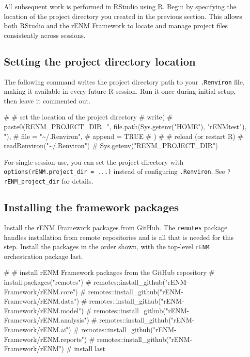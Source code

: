 \documentclass[
  letterpaper,
  DIV=11,
  numbers=noendperiod]{scrartcl}
\newenvironment{Shaded}{\begin{snugshade}}{\end{snugshade}}
\newcommand{\CommentTok}[1]{\textcolor[rgb]{0.37,0.37,0.37}{#1}}
\begin{document}
All subsequent work is performed in RStudio using R. Begin by specifying
the location of the project directory you created in the previous
section. This allows both RStudio and the rENM Framework to locate and
manage project files consistently across sessions.

\subsection{Setting the project directory
location}\label{setting-the-project-directory-location}

The following command writes the project directory path to your
\texttt{.Renviron} file, making it available in every future R session.
Run it once during initial setup, then leave it commented out.

\begin{Shaded}
\begin{Highlighting}[]
\CommentTok{\# \# set the location of the project directory}
\CommentTok{\# write(}
\CommentTok{\#   paste0(\textquotesingle{}RENM\_PROJECT\_DIR="\textquotesingle{}, file.path(Sys.getenv("HOME"), "rENMtest"), \textquotesingle{}"\textquotesingle{}),}
\CommentTok{\#   file = "\textasciitilde{}/.Renviron",}
\CommentTok{\#   append = TRUE}
\CommentTok{\# )}
\CommentTok{\# \# reload (or restart R)}
\CommentTok{\# readRenviron("\textasciitilde{}/.Renviron")}
\CommentTok{\# Sys.getenv("RENM\_PROJECT\_DIR")}
\end{Highlighting}
\end{Shaded}

For single-session use, you can set the project directory with
\texttt{options(rENM.project\_dir\ =\ ...)} instead of configuring
\texttt{.Renviron}. See \texttt{?rENM\_project\_dir} for details.

\subsection{Installing the framework
packages}\label{installing-the-framework-packages}

Install the rENM Framework packages from GitHub. The \texttt{remotes}
package handles installation from remote repositories and is all that is
needed for this step. Install the packages in the order shown, with the
top-level \texttt{rENM} orchestration package last.

\begin{Shaded}
\begin{Highlighting}[]
\CommentTok{\# \# install rENM Framework packages from the GitHub repository}
\CommentTok{\# install.packages("remotes")}
\CommentTok{\# remotes::install\_github("rENM{-}Framework/rENM.core")}
\CommentTok{\# remotes::install\_github("rENM{-}Framework/rENM.data")}
\CommentTok{\# remotes::install\_github("rENM{-}Framework/rENM.model")}
\CommentTok{\# remotes::install\_github("rENM{-}Framework/rENM.analysis")}
\CommentTok{\# remotes::install\_github("rENM{-}Framework/rENM.ai")}
\CommentTok{\# remotes::install\_github("rENM{-}Framework/rENM.reports")}
\CommentTok{\# remotes::install\_github("rENM{-}Framework/rENM")  \# install last}
\end{Highlighting}
\end{Shaded}
\end{document}
